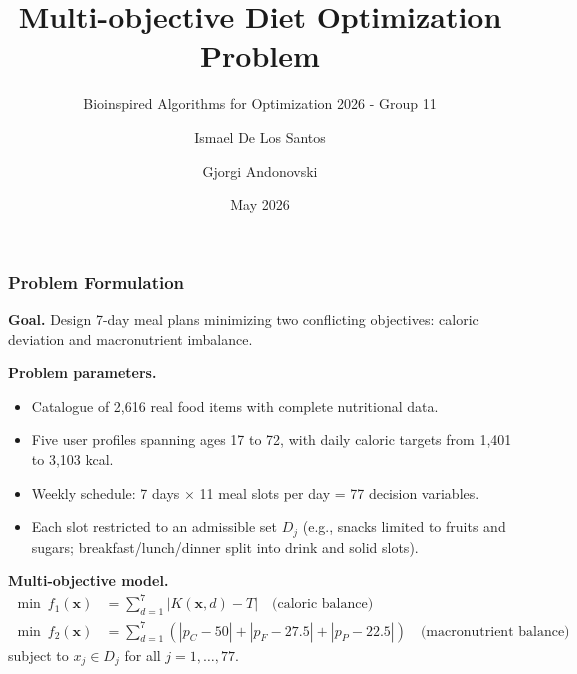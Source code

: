 \documentclass[aspectratio=169,10pt]{beamer}
\title[Multi-objective Diet Optimization]{\LARGE Multi-objective Diet Optimization Problem}
\subtitle{\large Bioinspired Algorithms for Optimization 2026 - Group 11}
\author[De Los Santos \& Andonovski]{Ismael De Los Santos \and Gjorgi Andonovski}
\institute[]{\textbf{Professors:} Cristian Ramírez Atencia, Ángel Panizo LLedot \\[0.2cm] Universidad Politécnica de Madrid (UPM)}
\date{May 2026}
\begin{document}
\begin{frame}
    \titlepage
\end{frame}


\begin{frame}
\frametitle{Problem Formulation}

\textbf{Goal.} Design 7-day meal plans minimizing two conflicting objectives: caloric deviation and macronutrient imbalance.

\vspace{0.3cm}

\textbf{Problem parameters.}
\begin{itemize}
  \item Catalogue of 2,616 real food items with complete nutritional data.
  \item Five user profiles spanning ages 17 to 72, with daily caloric targets from 1,401 to 3,103 kcal.
  \item Weekly schedule: 7 days $\times$ 11 meal slots per day = 77 decision variables.
  \item Each slot restricted to an admissible set $D_j$ (e.g., snacks limited to fruits and sugars; breakfast/lunch/dinner split into drink and solid slots).
\end{itemize}

\vspace{0.3cm}

\textbf{Multi-objective model.}
\begin{align}
\min\ f_1(\mathbf{x}) &= \sum_{d=1}^{7} |K(\mathbf{x},d) - T| \quad \text{(caloric balance)} \\
\min\ f_2(\mathbf{x}) &= \sum_{d=1}^{7} (|p_C - 50| + |p_F - 27.5| + |p_P - 22.5|) \quad \text{(macronutrient balance)}
\end{align}
subject to $x_j \in D_j$ for all $j = 1, \ldots, 77$.

\end{frame}
\end{document}
